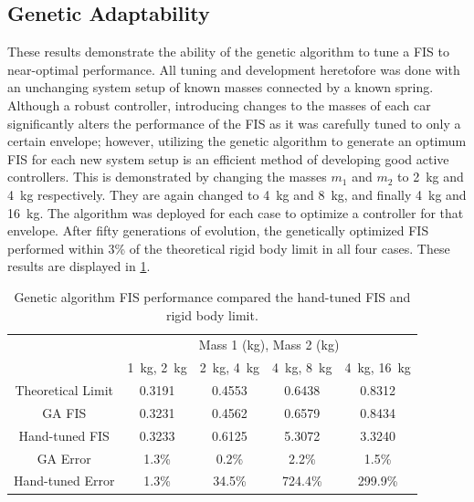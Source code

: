\subsection{Genetic Adaptability} These results demonstrate the ability of the genetic algorithm to tune a FIS
to near-optimal performance. All tuning and development heretofore was done with an unchanging system setup of
known masses connected by a known spring. Although a robust controller\cite{cohen:01jgcd}, introducing changes
to the masses of each car significantly alters the performance of the FIS as it was carefully tuned to only a
certain envelope; however, utilizing the genetic algorithm to generate an optimum FIS for each new system
setup is an efficient method of developing good active controllers. This is demonstrated by changing the
masses $m_1$ and $m_2$ to \SI{2}{\kilogram} and \SI{4}{\kilogram} respectively. They are again changed to
\SI{4}{\kilogram} and \SI{8}{\kilogram}, and finally \SI{4}{\kilogram} and \SI{16}{\kilogram}. The algorithm
was deployed for each case to optimize a controller for that envelope. After fifty generations of evolution,
the genetically optimized FIS performed within 3\% of the theoretical rigid body limit in all four cases.
These results are displayed in \cref{tab:gacomp}.  \begin{table} \centering \caption{Genetic algorithm
    FIS performance compared the hand-tuned FIS and rigid body limit.} \label{tab:gacomp}
    \begin{tabular}{|c|c|c|c|c|} \cline{2-5} \multicolumn{1}{c|}{} & \multicolumn{4}{|c|}{Mass 1
        (\si{\kilogram}), Mass 2 (\si{\kilogram})} \\\cline{2-5} \multicolumn{1}{c|}{} & \SI{1}{\kilogram},
        \SI{2}{\kilogram} & \SI{2}{\kilogram}, \SI{4}{\kilogram} & \SI{4}{\kilogram}, \SI{8}{\kilogram} &
        \SI{4}{\kilogram}, \SI{16}{\kilogram} \\\hline Theoretical Limit & 0.3191 & 0.4553 & 0.6438 & 0.8312
        \\\hline GA FIS & 0.3231 & 0.4562 & 0.6579 & 0.8434 \\\hline Hand-tuned FIS & 0.3233 & 0.6125 & 5.3072
                        & 3.3240 \\\hline\hline GA Error & \multicolumn{1}{|d|}{1.3\%} &
        \multicolumn{1}{|d|}{0.2\%} & \multicolumn{1}{|d|}{2.2\%} & \multicolumn{1}{|d|}{1.5\%} \\\hline
        Hand-tuned Error & \multicolumn{1}{|d|}{1.3\%} & \multicolumn{1}{|d|}{34.5\%} &
        \multicolumn{1}{|d|}{724.4\%} & \multicolumn{1}{|d|}{299.9\%} \\\hline \end{tabular} \end{table}

